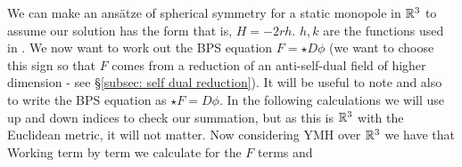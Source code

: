 \documentclass{article}
\begin{document}
\begin{example}
	We can make an ans\"atze of spherical symmetry for a static monopole in $\mathbb{R}^3$ to assume our solution has the form 	
that is, $H = -2rh$. $h,k$ are the functions used in \cite{Manton2004}. We now want to work out the BPS equation $F = \star D \phi$ (we want to choose this sign so that $F$ comes from a reduction of an anti-self-dual field of higher dimension - see \S\ref{subsec: self dual reduction}). It will be useful to note 
and also to write the BPS equation as $\star F = D\phi$. In the following calculations we will use up and down indices to check our summation, but as this is $\mathbb{R}^3$ with the Euclidean metric, it will not matter. Now considering YMH over $\mathbb{R}^3$ we have that 
Working term by term we calculate 
for the $F$ terms and 
\end{example}
\end{document}
